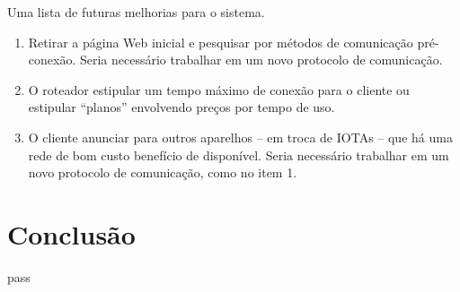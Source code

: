\documentclass{article}
\begin{document}
Uma lista de futuras melhorias para o sistema.

\begin{enumerate}
\item Retirar a página Web inicial e pesquisar por métodos de comunicação pré-conexão.
Seria necessário trabalhar em um novo protocolo de comunicação.
\item O roteador estipular um tempo máximo de conexão para o cliente ou estipular ``planos'' envolvendo preços
por tempo de uso.
\item O cliente anunciar para outros aparelhos -- em troca de IOTAs -- que há uma rede de bom custo benefício
de disponível. Seria necessário trabalhar em um novo protocolo de comunicação, como no item 1.
\end{enumerate}

\section{Conclusão}
pass


%
%
\end{document}
